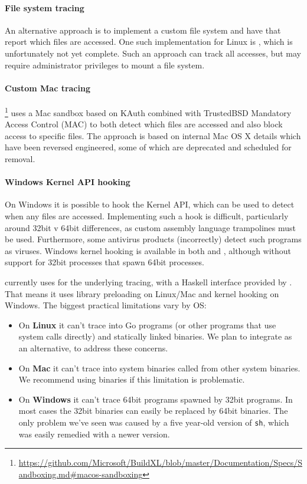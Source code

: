 \paragraph{File system tracing} An alternative approach is to implement a custom file system and have that report which files are accessed. One such implementation for Linux is \tracedfs \cite{tracedfs}, which is unfortunately not yet complete. Such an approach can track all accesses, but may require administrator privileges to mount a file system.

\paragraph{Custom Mac tracing} \BuildXL \cite{buildxl}\footnote{\url{https://github.com/Microsoft/BuildXL/blob/master/Documentation/Specs/Sandboxing.md\#macos-sandboxing}} uses a Mac sandbox based on KAuth combined with TrustedBSD Mandatory Access Control (MAC) to both detect which files are accessed and also block access to specific files. The approach is based on internal Mac OS X details which have been reversed engineered, some of which are deprecated and scheduled for removal.

\paragraph{Windows Kernel API hooking} On Windows it is possible to hook the Kernel API, which can be used to detect when any files are accessed. Implementing such a hook is difficult, particularly around 32bit v 64bit differences, as custom assembly language trampolines must be used. Furthermore, some antivirus products (incorrectly) detect such programs as viruses. Windows kernel hooking is available in both \Fsatrace and \Bigbro, although without support for 32bit processes that spawn 64bit processes.

\postparagraphs

\Rattle currently uses \Fsatrace for the underlying tracing, with a Haskell interface provided by \Shake. That means it uses library preloading on Linux/Mac and kernel hooking on Windows. The biggest practical limitations vary by OS:

\begin{itemize}
\item On \textbf{Linux} it can't trace into Go programs (or other programs that use system calls directly) and statically linked binaries. We plan to integrate \Bigbro as an alternative, to address these concerns.
\item On \textbf{Mac} it can't trace into system binaries called from other system binaries. We recommend using \Nix binaries if this limitation is problematic.
\item On \textbf{Windows} it can't trace 64bit programs spawned by 32bit programs. In most cases the 32bit binaries can easily be replaced by 64bit binaries. The only problem we've seen was caused by a five year-old version of \texttt{sh}, which was easily remedied with a newer version.
\end{itemize}

